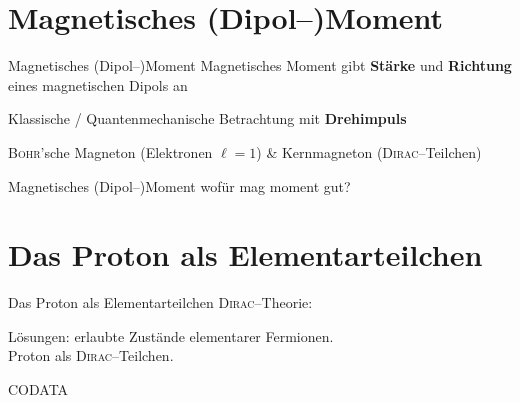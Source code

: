 \documentclass[t,9pt]{beamer}
\newcommand{\td}{\text{d}}
\begin{document}
        \section{Magnetisches (Dipol--)Moment}
        \begin{frame}{Magnetisches (Dipol--)Moment}
                \pause
                Magnetisches Moment gibt \textbf{Stärke} und \textbf{Richtung} eines magnetischen Dipols an
                \begin{center}
                        \tcboxmath{\boldsymbol{m}=\dfrac{1}{2}\int_{}^{}\td ^3r\left[\boldsymbol{r}\times \boldsymbol{j}\left(\boldsymbol{r}\right)\right]\qquad \vv{m}=I\cdot\boldsymbol{A}}
                \end{center}
                \pause
                Klassische / Quantenmechanische Betrachtung mit \textbf{Drehimpuls}
                \begin{center}
                \end{center}
                \pause
                \textsc{Bohr}'sche Magneton (Elektronen $\ell=1$) \& Kernmagneton (\textsc{Dirac}--Teilchen)
                \begin{center}
                \end{center}
        \end{frame}

        \begin{frame}{Magnetisches (Dipol--)Moment}
                wofür mag moment gut?
        \end{frame}

        \section{Das Proton als Elementarteilchen}
        \begin{frame}{Das Proton als Elementarteilchen}
                \textsc{Dirac}--Theorie: 
                \begin{center}
                \end{center}
                Lösungen: erlaubte Zustände elementarer Fermionen.
                \pause %
                \\\vspace{.5cm} Proton als \textsc{Dirac}--Teilchen.
                \begin{center}
                \end{center}
                \tiny\hfill CODATA\cite{CODATA_nuclear_magneton}\normalsize
        \end{frame}
\end{document}
